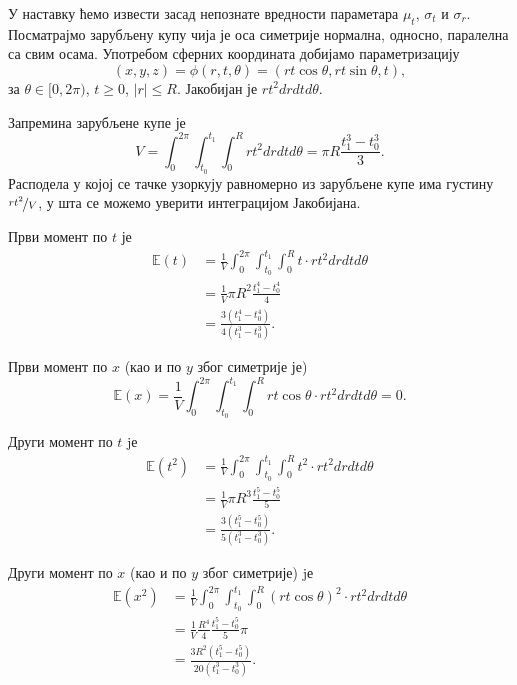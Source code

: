 \documentclass[12pt, a4paper, twoside]{book}
\numberwithin{equation}{chapter}
\numberwithin{theorem}{section}
\numberwithin{definition}{section}
\numberwithin{definitionChapter}{chapter}
\begin{document}
У наставку ћемо извести засад непознате вредности параметара $\mu_t$, $\sigma_t$ и $\sigma_r$.
Посматрајмо зарубљену купу чија је оса симетрије нормална, односно, паралелна са свим осама.
Употребом сферних координата добијамо параметризацију
\begin{equation}
	(x, y, z) = \phi(r, t, \theta) = (rt\cos\theta, rt\sin\theta, t),
\end{equation}
за $\theta \in [0, 2\pi)$, $t\geq 0$, $|r| \leq R$. Јакобијан је $rt^2drdtd\theta$.

Запремина зарубљене купе је
\begin{equation}
	V = \int_{0}^{2\pi}\int_{t_0}^{t_1}\int_{0}^{R}rt^2drdtd\theta = \pi R \frac{t_1^3 - t_0^3}{3}.
\end{equation}
Расподела у којој се тачке узоркују равномерно из зарубљене купе има густину $\nicefrac{rt^2}{V}$, у шта се можемо
уверити интеграцијом Јакобијана.

Први момент по $t$ је
\begin{equation}
	\begin{split}
		\mathbb{E}(t) & = \frac{1}{V}\int_{0}^{2\pi}\int_{t_0}^{t_1}\int_{0}^{R}t \cdot rt^2drdtd\theta \\
			& = \frac{1}{V}\pi R^2 \frac{t_1^4 - t_0^4}{4} \\
			& = \frac{3(t_1^4 - t_0^4)}{4(t_1^3 - t_0^3)}.
	\end{split}
\end{equation}

Први момент по $x$ (као и по $y$ због симетрије је)
\begin{equation}
	\mathbb{E}(x) = \frac{1}{V}\int_{0}^{2\pi}\int_{t_0}^{t_1}\int_{0}^{R}rt\cos\theta \cdot rt^2drdtd\theta = 0.
\end{equation}

Други момент по $t$ jе
\begin{equation}
	\begin{split}
		\mathbb{E}(t^2) & = \frac{1}{V}\int_{0}^{2\pi}\int_{t_0}^{t_1}\int_{0}^{R}t^2 \cdot rt^2drdtd\theta \\
			& = \frac{1}{V}\pi R^3\frac{t_1^5 - t_0^5}{5} \\
			& = \frac{3(t_1^5 - t_0^5)}{5(t_1^3 - t_0^3)}.
	\end{split}
\end{equation}

Други момент по $x$ (као и по $y$ због симетрије) jе
\begin{equation}
	\begin{split}
		\mathbb{E}(x^2) & = \frac{1}{V}\int_{0}^{2\pi}\int_{t_0}^{t_1}\int_{0}^{R}(rt\cos\theta)^2\cdot rt^2drdtd\theta \\
			& = \frac{1}{V}\frac{R^4}{4}\frac{t_1^5 - t_0^5}{5}\pi \\
			& = \frac{3R^2(t_1^5 - t_0^5)}{20(t_1^3 - t_0^3)}.
	\end{split}
\end{equation}
\end{document}
